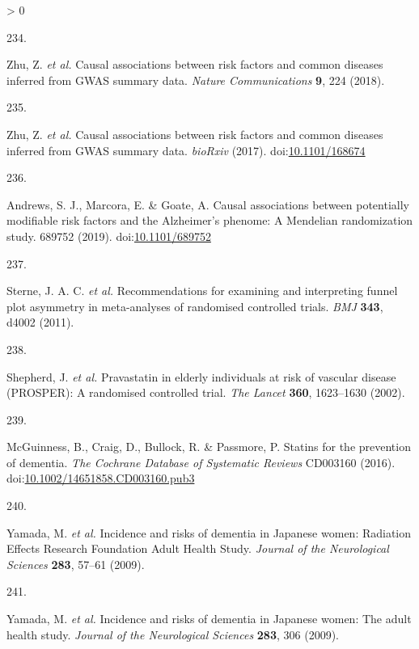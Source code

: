 \documentclass[a4paper, twoside]{templates/ociamthesis}
\newlength{\cslhangindent}
\newlength{\csllabelwidth}
\newenvironment{CSLReferences}[3] %
 {%
  \setlength{\parindent}{0pt}
  \ifodd #1 \everypar{\setlength{\hangindent}{\cslhangindent}}\ignorespaces\fi
  \ifnum #2 > 0
  \setlength{\parskip}{#2\baselineskip}
  \fi
 }%
 {}
\newcommand{\CSLLeftMargin}[1]{\parbox[t]{\maxof{\widthof{#1}}{\csllabelwidth}}{#1}}
\newcommand{\CSLRightInline}[1]{\parbox[t]{\linewidth - \csllabelwidth}{#1}}
\begin{document}
\begin{CSLReferences}{0}{0}
\leavevmode\hypertarget{ref-zhu2018}{}%
\CSLLeftMargin{234. }
\CSLRightInline{Zhu, Z. \emph{et al.} Causal associations between risk factors and common diseases inferred from {GWAS} summary data. \emph{Nature Communications} \textbf{9}, 224 (2018).}

\leavevmode\hypertarget{ref-zhu2017}{}%
\CSLLeftMargin{235. }
\CSLRightInline{Zhu, Z. \emph{et al.} Causal associations between risk factors and common diseases inferred from {GWAS} summary data. \emph{bioRxiv} (2017). doi:\href{https://doi.org/10.1101/168674}{10.1101/168674}}

\leavevmode\hypertarget{ref-andrews2019}{}%
\CSLLeftMargin{236. }
\CSLRightInline{Andrews, S. J., Marcora, E. \& Goate, A. Causal associations between potentially modifiable risk factors and the {Alzheimer}'s phenome: A {Mendelian} randomization study. 689752 (2019). doi:\href{https://doi.org/10.1101/689752}{10.1101/689752}}

\leavevmode\hypertarget{ref-sterne2011}{}%
\CSLLeftMargin{237. }
\CSLRightInline{Sterne, J. A. C. \emph{et al.} Recommendations for examining and interpreting funnel plot asymmetry in meta-analyses of randomised controlled trials. \emph{BMJ} \textbf{343}, d4002 (2011).}

\leavevmode\hypertarget{ref-shepherd2002a}{}%
\CSLLeftMargin{238. }
\CSLRightInline{Shepherd, J. \emph{et al.} Pravastatin in elderly individuals at risk of vascular disease ({PROSPER}): A randomised controlled trial. \emph{The Lancet} \textbf{360}, 1623--1630 (2002).}

\leavevmode\hypertarget{ref-mcguinness2016}{}%
\CSLLeftMargin{239. }
\CSLRightInline{McGuinness, B., Craig, D., Bullock, R. \& Passmore, P. Statins for the prevention of dementia. \emph{The Cochrane Database of Systematic Reviews} CD003160 (2016). doi:\href{https://doi.org/10.1002/14651858.CD003160.pub3}{10.1002/14651858.CD003160.pub3}}

\leavevmode\hypertarget{ref-yamada2009}{}%
\CSLLeftMargin{240. }
\CSLRightInline{Yamada, M. \emph{et al.} Incidence and risks of dementia in {Japanese} women: Radiation {Effects Research Foundation Adult Health Study}. \emph{Journal of the Neurological Sciences} \textbf{283}, 57--61 (2009).}

\leavevmode\hypertarget{ref-yamada2009a}{}%
\CSLLeftMargin{241. }
\CSLRightInline{Yamada, M. \emph{et al.} Incidence and risks of dementia in {Japanese} women: The adult health study. \emph{Journal of the Neurological Sciences} \textbf{283}, 306 (2009).}


\end{CSLReferences}
\end{document}

